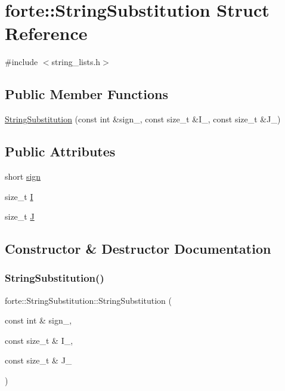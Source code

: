 \hypertarget{structforte_1_1_string_substitution}{}\section{forte\+:\+:String\+Substitution Struct Reference}
\label{structforte_1_1_string_substitution}


{\ttfamily \#include $<$string\+\_\+lists.\+h$>$}

\subsection*{Public Member Functions}
\begin{DoxyCompactItemize}
\item 
\mbox{\hyperlink{structforte_1_1_string_substitution_a96230cdee6f41bb6a581b35925a1cff4}{String\+Substitution}} (const int \&sign\+\_\+, const size\+\_\+t \&I\+\_\+, const size\+\_\+t \&J\+\_\+)
\end{DoxyCompactItemize}
\subsection*{Public Attributes}
\begin{DoxyCompactItemize}
\item 
short \mbox{\hyperlink{structforte_1_1_string_substitution_ab4e8fddca2b15874cec9d8caefa48119}{sign}}
\item 
size\+\_\+t \mbox{\hyperlink{structforte_1_1_string_substitution_a25b41abdcd8fbef8776beea718477fc8}{I}}
\item 
size\+\_\+t \mbox{\hyperlink{structforte_1_1_string_substitution_a9cabd6a7424ba61c1a3af9a16e2f9464}{J}}
\end{DoxyCompactItemize}


\subsection{Constructor \& Destructor Documentation}
\mbox{\label{structforte_1_1_string_substitution_a96230cdee6f41bb6a581b35925a1cff4}} 
\subsubsection{\texorpdfstring{String\+Substitution()}{StringSubstitution()}}
{\footnotesize\ttfamily forte\+::\+String\+Substitution\+::\+String\+Substitution (\begin{DoxyParamCaption}\item[{const int \&}]{sign\+\_\+,  }\item[{const size\+\_\+t \&}]{I\+\_\+,  }\item[{const size\+\_\+t \&}]{J\+\_\+ }\end{DoxyParamCaption})\hspace{0.3cm}{\ttfamily [inline]}}



